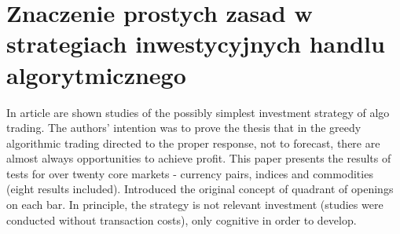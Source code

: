 \chapter{Znaczenie prostych zasad w strategiach inwestycyjnych handlu algorytmicznego}
\label{SimpleRules} %

In article are shown studies of the possibly simplest investment strategy of algo trading. The authors' intention was to prove the thesis that in the greedy algorithmic trading directed to the proper response, not to forecast, there are almost always opportunities to achieve profit. This paper presents the results of tests for over twenty core markets - currency pairs, indices and commodities (eight results included). Introduced the original concept of quadrant of openings on each bar. In principle, the strategy is not relevant investment (studies were conducted without transaction costs), only cognitive in order to develop.

